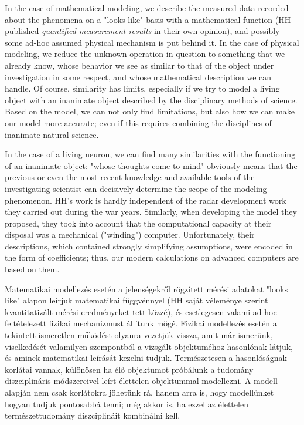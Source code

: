 \ifx\magyar\undefined

In the case of mathematical modeling, we describe the measured data recorded about the phenomena on a "looks like" basis with a mathematical function (HH published \textit{quantified measurement results} in their own opinion), and possibly some ad-hoc assumed physical mechanism is put behind it.
In the case of physical modeling, we reduce the unknown operation in question to something that we already know, whose behavior we see as similar to that of the object under investigation in some respect, and whose mathematical description we can handle. Of course, similarity has limits, especially if we try to model a living object with an inanimate object described by the disciplinary methods of science. Based on the model, we can not only find limitations, but also how we can make our model more accurate; even if this requires combining the disciplines of inanimate natural science.

In the case of a living neuron, we can find many similarities with the functioning of an inanimate object: "whose thoughts come to mind" obviously means that the previous or even the most recent knowledge and available tools of the investigating scientist can decisively determine the scope of the modeling phenomenon. HH's work is hardly independent of the radar development work they carried out during the war years.
Similarly, when developing the model they proposed,
they took into account that the computational capacity at their disposal was a mechanical ("winding") computer. Unfortunately, their descriptions, which contained strongly simplifying assumptions, were encoded in the form of coefficients; thus, our modern calculations on advanced computers are based on them.

\else
Matematikai modellezés esetén a jelenségekről rögzített mérési adatokat "looks like" alapon leírjuk matematikai függvénnyel (HH saját véleménye szerint kvantitatizált mérési eredményeket tett közzé), és esetlegesen valami ad-hoc feltételezett fizikai mechanizmust állítunk mögé.
Fizikai modellezés esetén a tekintett ismeretlen működést olyanra vezetjük vissza, amit már ismerünk, viselkedését valamilyen szempontból a vizsgált objektuméhoz hasonlónak látjuk, és aminek matematikai leírását kezelni tudjuk. Természetesen a hasonlóságnak korlátai vannak, különösen ha élő objektumot próbálunk a tudomány diszciplináris módszereivel leírt élettelen objektummal modellezni. A modell alapján nem csak korlátokra jöhetünk rá, hanem arra is, hogy modellünket hogyan tudjuk pontosabbá tenni; még akkor is, ha ezzel az élettelen természettudomány diszciplináit kombinálni kell.

